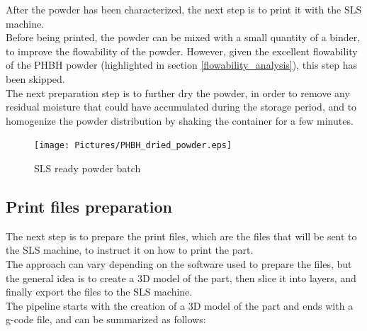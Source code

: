 \documentclass{article}
\begin{document}
    After the powder has been characterized, the next step is to print it with the SLS machine. \\

    Before being printed, the powder can be mixed with a small quantity of a binder, to improve the flowability of the powder. 
    However, given the excellent flowability of the PHBH powder (highlighted in section \ref{flowability_analysis}), this step has been skipped. \\

    The next preparation step is to further dry the powder, in order to remove any residual moisture
    that could have accumulated during the storage period, and to homogenize the powder distribution 
    by shaking the container for a few minutes. \\

                \begin{figure}[h!]
                    \centering
                    \texttt{[image: Pictures/PHBH\_dried\_powder.eps]}
                    \caption{SLS ready powder batch}
                    \label{fig:PHBH_collected_powder}
                    
                \end{figure}

        \subsection{Print files preparation\label{Print_files_preparation}}

        The next step is to prepare the print files, which are the files that will be sent to the SLS machine, 
        to instruct it on how to print the part. \\

        The approach can vary depending on the software used to prepare the files, but the general idea is to 
        create a 3D model of the part, then slice it into layers, and finally export the files to the SLS machine. \\

        The pipeline starts with the creation of a 3D model of the part and ends with a g-code file, and can 
        be summarized as follows: 
        
\end{document}
